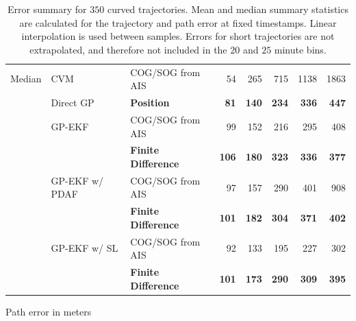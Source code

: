 \begin{table}
\begin{subtable}{\textwidth}
{\begin{tabular}{lllrrrrr}
                \hline
                Median  & CVM            & COG/SOG from AIS       & 54       & 265      & 715     & 1138    & 1863     \\
                        & Direct GP      & \bf Position           & \bf 81   & \bf 140  & \bf 234 & \bf 336 & \bf 447  \\
                        & GP-EKF         & COG/SOG from AIS       & 99       & 152      & 216     & 295     & 408      \\
                        &                & \bf Finite Difference  & \bf 106  & \bf 180  & \bf 323 & \bf 336 & \bf  377 \\
                        & GP-EKF w/ PDAF & COG/SOG from AIS       & 97       & 157      & 290     & 401     & 908      \\
                        &                & \bf  Finite Difference & \bf  101 & \bf  182 & \bf 304 & \bf 371 & \bf 402  \\
                        & GP-EKF w/ SL   & COG/SOG from AIS       & 92       & 133      & 195     & 227     & 302      \\
                        &                & \bf  Finite Difference & \bf 101  & \bf 173  & \bf 290 & \bf 309 & \bf 395  \\
                \bottomrule
            \end{tabular}
        }
        \caption{Path error in meters}
        \label{table:stats_curved_path_err}
    \end{subtable}
    \caption{Error summary for $350$ curved trajectories. Mean and median summary statistics are calculated for the trajectory and path error at fixed timestamps. Linear interpolation is used between samples. Errors for short trajectories are not extrapolated, and therefore not included in the $20$ and $25$ minute bins.}
    \label{table:stats_curved_error}
\end{table}

